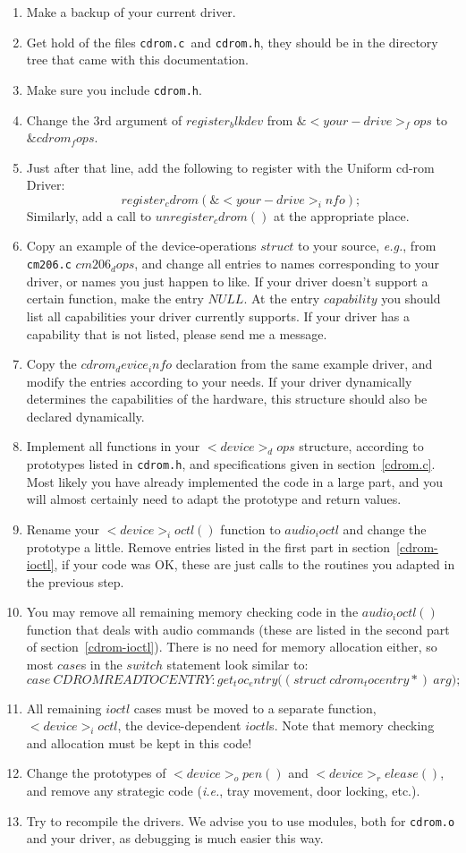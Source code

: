 \documentclass{article}
\def\UCD{{\sc Uniform cd-rom Driver}}
\def\cdromc{{\tt {cdrom.c}}}
\def\cdromh{{\tt {cdrom.h}}}
\def\fo{\sl}                    %
\def\ie{{\fo i.e.}}
\def\eg{{\fo e.g.}}
\begin{document}
\begin{enumerate}
\item Make a backup of your current driver. 
\item Get hold of the files \cdromc\ and \cdromh, they should be in
  the directory tree that came with this documentation.
\item Make sure you include \cdromh.
\item Change the 3rd argument of $register_blkdev$ from
$\&<your-drive>_fops$ to $\&cdrom_fops$. 
\item Just after that line, add the following to register with the \UCD:
  $$register_cdrom(\&<your-drive>_info);$$
  Similarly, add a call to $unregister_cdrom()$ at the appropriate place.
\item Copy an example of the device-operations $struct$ to your
  source, \eg, from {\tt {cm206.c}} $cm206_dops$, and change all
  entries to names corresponding to your driver, or names you just
  happen to like. If your driver doesn't support a certain function,
  make the entry $NULL$. At the entry $capability$ you should list all
  capabilities your driver currently supports. If your driver
  has a capability that is not listed, please send me a message.
\item Copy the $cdrom_device_info$ declaration from the same example
  driver, and modify the entries according to your needs. If your
  driver dynamically determines the capabilities of the hardware, this
  structure should also be declared dynamically. 
\item Implement all functions in your $<device>_dops$ structure,
  according to prototypes listed in \cdromh, and specifications given
  in section~\ref{cdrom.c}. Most likely you have already implemented
  the code in a large part, and you will almost certainly need to adapt the
  prototype and return values.
\item Rename your $<device>_ioctl()$ function to $audio_ioctl$ and
  change the prototype a little. Remove entries listed in the first
  part in section~\ref{cdrom-ioctl}, if your code was OK, these are
  just calls to the routines you adapted in the previous step.
\item You may remove all remaining memory checking code in the
  $audio_ioctl()$ function that deals with audio commands (these are
  listed in the second part of section~\ref{cdrom-ioctl}). There is no
  need for memory allocation either, so most $case$s in the $switch$
  statement look similar to:
  $$
  case\ CDROMREADTOCENTRY\colon get_toc_entry\bigl((struct\ 
  cdrom_tocentry *{})\ arg\bigr);
  $$
\item All remaining $ioctl$ cases must be moved to a separate
  function, $<device>_ioctl$, the device-dependent $ioctl$s. Note that
  memory checking and allocation must be kept in this code!
\item Change the prototypes of $<device>_open()$ and
  $<device>_release()$, and remove any strategic code (\ie, tray
  movement, door locking, etc.).
\item Try to recompile the drivers. We advise you to use modules, both
  for {\tt {cdrom.o}} and your driver, as debugging is much easier this
  way.
\end{enumerate} 
\end{document}
